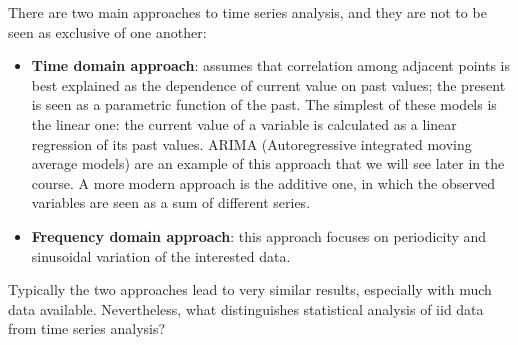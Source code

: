 There are two main approaches to time series analysis, and they are not to be seen as exclusive of one another:
\begin{itemize}
    \item \textbf{Time domain approach}: assumes that correlation among adjacent points is best explained as the dependence of current value on past values; the present is seen as a parametric function of the past. The simplest of these models is the linear one: the current value of a variable is calculated as a linear regression of its past values. ARIMA (Autoregressive integrated moving average models) are an example of this approach that we will see later in the course. A more modern approach is the additive one, in which the observed variables are seen as a sum of different series.
    \item \textbf{Frequency domain approach}: this approach focuses on periodicity and sinusoidal variation of the interested data.
\end{itemize}
Typically the two approaches lead to very similar results, especially with much data available. Nevertheless, what distinguishes statistical analysis of iid data from time series analysis?

